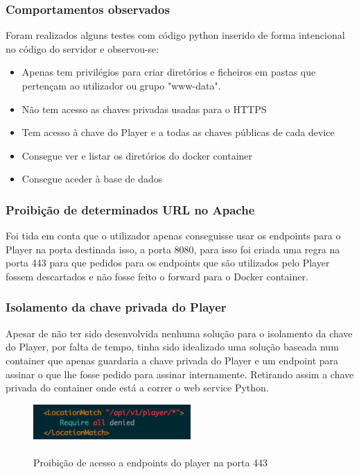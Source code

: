 \documentclass[pdftex,12pt,a4paper]{report}
\begin{document}
\subsubsection{Comportamentos observados}
Foram realizados alguns testes com código python inserido de forma intencional no código do servidor e observou-se:

\begin{itemize}
\item Apenas tem privilégios para criar diretórios e ficheiros em pastas que pertençam ao utilizador ou grupo "www-data".
\item Não tem acesso as chaves privadas usadas para o HTTPS
\item Tem acesso à chave do Player e a todas as chaves públicas de cada device
\item Consegue ver e listar os diretórios do docker container
\item Consegue aceder à base de dados
\end{itemize}

\subsubsection{Proibição de determinados URL no Apache}

Foi tida em conta que o utilizador apenas conseguisse usar os endpoints para o Player na porta destinada isso, a porta 8080, para isso foi criada uma regra na porta 443 para que pedidos para os endpoints que são utilizados pelo Player fossem descartados e não fosse feito o forward para o Docker container.

\subsubsection{Isolamento da chave privada do Player}

Apesar de não ter sido desenvolvida nenhuma solução para o isolamento da chave do Player, por falta de tempo, tinha sido idealizado uma solução baseada num container que apenas guardaria a chave privada do Player e um endpoint para assinar o que lhe fosse pedido para assinar internamente. Retirando assim a chave privada do container onde está a correr o web service Python.

\begin{figure}[!htb]
\center
 \includegraphics[width=60mm,scale=1]{player_denied.png}
 \caption{\\Proibição de acesso a endpoints do player na porta 443}
 \label{fig:docker_c}
\end{figure}
\end{document}
